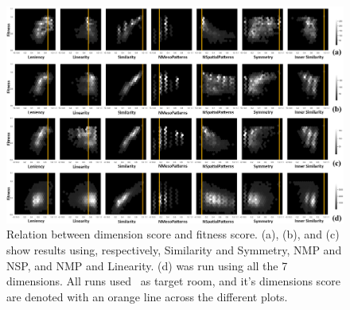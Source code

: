 \begin{figure}[h]
\centerline{\includegraphics[width=\textwidth]{figures/figure6.png}}
\caption{Relation between dimension score and fitness score. (a), (b), and (c) show results using, respectively, Similarity and Symmetry, NMP and NSP, and NMP and Linearity. (d) was run using all the 7 dimensions. All runs used~ as target room, and it's dimensions score are denoted with an orange line across the different plots.}
\label{figs:dimensions-related-fitness}
\end{figure}




